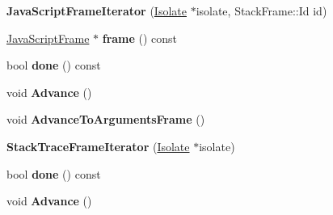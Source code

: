 \begin{DoxyCompactItemize}
\item 
{\bfseries Java\+Script\+Frame\+Iterator} (\hyperlink{classv8_1_1internal_1_1_isolate}{Isolate} $\ast$isolate, Stack\+Frame\+::\+Id id)\hypertarget{classv8_1_1internal_1_1_b_a_s_e___e_m_b_e_d_d_e_d_a646cf41fecfaf37023def6909fb95f48}{}\label{classv8_1_1internal_1_1_b_a_s_e___e_m_b_e_d_d_e_d_a646cf41fecfaf37023def6909fb95f48}

\item 
\hyperlink{classv8_1_1internal_1_1_java_script_frame}{Java\+Script\+Frame} $\ast$ {\bfseries frame} () const \hypertarget{classv8_1_1internal_1_1_b_a_s_e___e_m_b_e_d_d_e_d_a2417cfd6ccce46fd74b417e6624ebd59}{}\label{classv8_1_1internal_1_1_b_a_s_e___e_m_b_e_d_d_e_d_a2417cfd6ccce46fd74b417e6624ebd59}

\item 
bool {\bfseries done} () const \hypertarget{classv8_1_1internal_1_1_b_a_s_e___e_m_b_e_d_d_e_d_a77341a218534a8b462a85c130ee86cfc}{}\label{classv8_1_1internal_1_1_b_a_s_e___e_m_b_e_d_d_e_d_a77341a218534a8b462a85c130ee86cfc}

\item 
void {\bfseries Advance} ()\hypertarget{classv8_1_1internal_1_1_b_a_s_e___e_m_b_e_d_d_e_d_a3d99e222f406f37deb9382e9e370b68a}{}\label{classv8_1_1internal_1_1_b_a_s_e___e_m_b_e_d_d_e_d_a3d99e222f406f37deb9382e9e370b68a}

\item 
void {\bfseries Advance\+To\+Arguments\+Frame} ()\hypertarget{classv8_1_1internal_1_1_b_a_s_e___e_m_b_e_d_d_e_d_aec1bae6cb06b64ae445fcccf983306d0}{}\label{classv8_1_1internal_1_1_b_a_s_e___e_m_b_e_d_d_e_d_aec1bae6cb06b64ae445fcccf983306d0}

\item 
{\bfseries Stack\+Trace\+Frame\+Iterator} (\hyperlink{classv8_1_1internal_1_1_isolate}{Isolate} $\ast$isolate)\hypertarget{classv8_1_1internal_1_1_b_a_s_e___e_m_b_e_d_d_e_d_a848ba9286d370b8248c893d914067907}{}\label{classv8_1_1internal_1_1_b_a_s_e___e_m_b_e_d_d_e_d_a848ba9286d370b8248c893d914067907}

\item 
bool {\bfseries done} () const \hypertarget{classv8_1_1internal_1_1_b_a_s_e___e_m_b_e_d_d_e_d_a77341a218534a8b462a85c130ee86cfc}{}\label{classv8_1_1internal_1_1_b_a_s_e___e_m_b_e_d_d_e_d_a77341a218534a8b462a85c130ee86cfc}

\item 
void {\bfseries Advance} ()\hypertarget{classv8_1_1internal_1_1_b_a_s_e___e_m_b_e_d_d_e_d_a3d99e222f406f37deb9382e9e370b68a}{}\label{classv8_1_1internal_1_1_b_a_s_e___e_m_b_e_d_d_e_d_a3d99e222f406f37deb9382e9e370b68a}


\end{DoxyCompactItemize}
